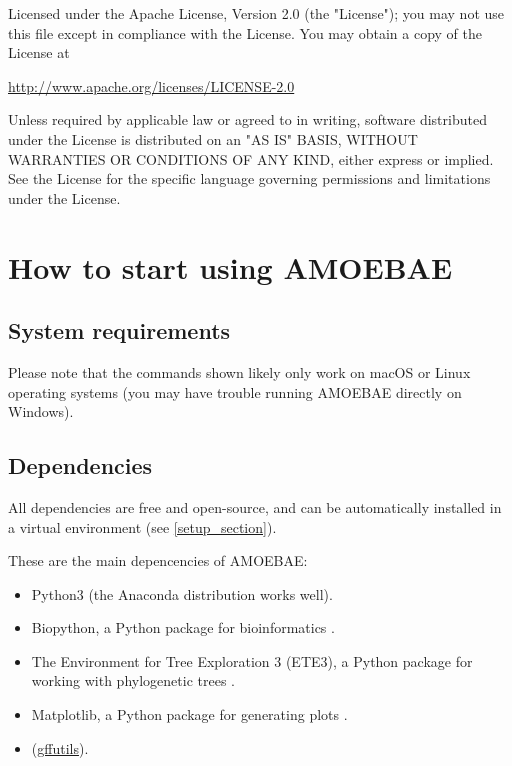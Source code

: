 \documentclass[12pt,letterpaper]{article}
\begin{document}
\begin{linenumbers}
Licensed under the Apache License, Version 2.0 (the "License"); you may not use this file except in compliance with the License. You may obtain a copy of the License at

\url{http://www.apache.org/licenses/LICENSE-2.0}

Unless required by applicable law or agreed to in writing, software distributed under the License is distributed on an "AS IS" BASIS, WITHOUT WARRANTIES OR CONDITIONS OF ANY KIND, either express or implied. See the License for the specific language governing permissions and limitations under the License.


\section{How to start using AMOEBAE}

\subsection{System requirements}

Please note that the commands shown likely only work on macOS or Linux operating
systems (you may have trouble running AMOEBAE directly on Windows). 


\subsection{Dependencies}
\label{dependencies_section}

All dependencies are free and open-source, and can be automatically installed
in a virtual environment (see \autoref*{setup_section}).

These are the main depencencies of AMOEBAE:

\begin{itemize}

\item Python3 (the Anaconda distribution works well).

\item Biopython, a Python package for bioinformatics \citep{cock2009}.

\item The Environment for Tree Exploration 3 (ETE3), a Python package for
    working with phylogenetic trees \citep{huerta-cepas2016}.

\item Matplotlib, a Python package for generating plots \citep{hunter2007}.

\item (\href{https://pythonhosted.org/gffutils/}{gffutils}).


\end{itemize}
\end{linenumbers}
\end{document}
